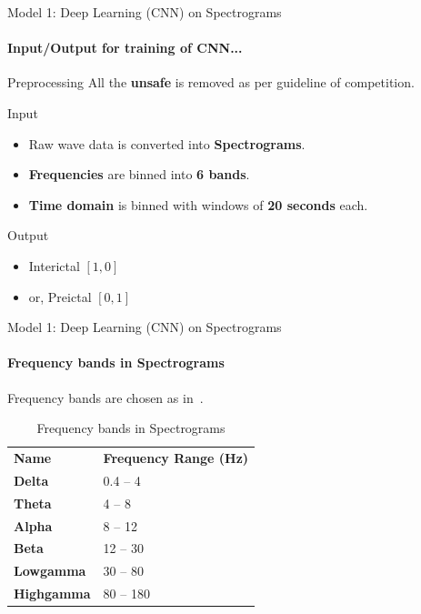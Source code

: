 \documentclass{beamer}
\begin{document}
\begin{frame}{Model 1: Deep Learning (CNN) on Spectrograms}
  \framesubtitle{Input/Output for training of CNN...}

  \begin{block}{Preprocessing}
    All the \textbf{unsafe} is removed as per guideline of competition.
  \end{block}
  
  \begin{block}{Input}
    \begin{itemize}
    \item Raw wave data is converted into \textbf{Spectrograms}.
    \item \textbf{Frequencies} are binned into \textbf{6 bands}.
    \item \textbf{Time domain} is binned with windows of \textbf{20 seconds} each.
    \end{itemize}
  \end{block}  

  \begin{block}{Output}
    \begin{itemize}
      \item Interictal $[1, 0]$
      \item or, Preictal   $[0, 1]$
    \end{itemize}
  \end{block}  

\end{frame}

\begin{frame}{Model 1: Deep Learning (CNN) on Spectrograms}
  \framesubtitle{Frequency bands in Spectrograms}

  Frequency bands are chosen as in~\cite{korshunova_faculty_2015}.
  
  \begin{block}{}
    \begin{table}[]
      \centering
      \caption{Frequency bands in Spectrograms}
      \begin{tabular}{ll}
        \textbf{Name}               & \textbf{Frequency Range (Hz)} \\
        \textbf{Delta}     & 0.4 -- 4                      \\
        \textbf{Theta}     & 4 -- 8                        \\
        \textbf{Alpha}     & 8 -- 12                       \\
        \textbf{Beta}      & 12 -- 30                      \\
        \textbf{Lowgamma}  & 30 -- 80                      \\
        \textbf{Highgamma} & 80 -- 180                    
      \end{tabular}
    \end{table}
  \end{block}

\end{frame}
\end{document}
